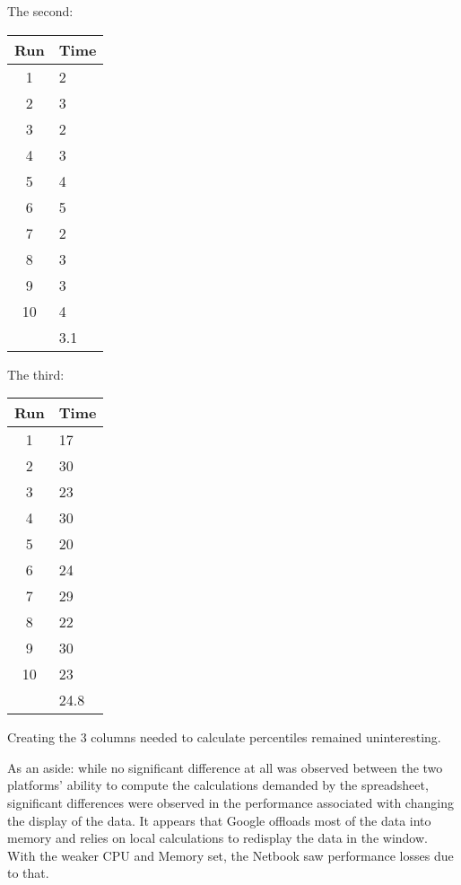 \documentclass[12pt,oneside,letterpaper,titlepage]{article}
\begin{document}
The second:

\begin{tabular}{| c | l |}
  \hline
  Run  & Time \\ \hline
  1    & 2    \\ \hline
  2    & 3    \\ \hline
  3    & 2    \\ \hline
  4    & 3    \\ \hline
  5    & 4    \\ \hline
  6    & 5    \\ \hline
  7    & 2    \\ \hline
  8    & 3    \\ \hline
  9    & 3    \\ \hline
  10   & 4    \\ \hline
       & 3.1  \\
  \hline
\end{tabular}

The third:

\begin{tabular}{| c | l |}
  \hline
  Run  & Time \\ \hline
  1    & 17   \\ \hline
  2    & 30   \\ \hline
  3    & 23   \\ \hline
  4    & 30   \\ \hline
  5    & 20   \\ \hline
  6    & 24   \\ \hline
  7    & 29   \\ \hline
  8    & 22   \\ \hline
  9    & 30   \\ \hline
  10   & 23   \\ \hline
       & 24.8 \\
  \hline
\end{tabular}

Creating the 3 columns needed to calculate percentiles remained uninteresting.

As an aside: while no significant difference at all was observed between the
two platforms' ability to compute the calculations demanded by the spreadsheet,
significant differences were observed in the performance associated with
changing the display of the data.  It appears that Google offloads most of the
data into memory and relies on local calculations to redisplay the data in the
window.  With the weaker CPU and Memory set, the Netbook saw performance losses
due to that.
\end{document}
